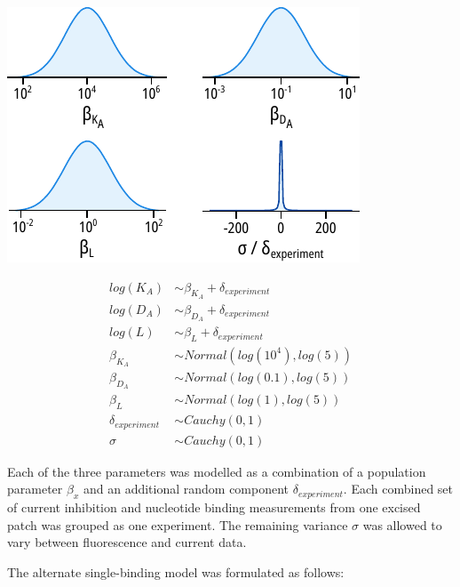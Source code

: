 \begin{minipage}{.5\textwidth}
\centering
\includegraphics[width=\textwidth]{mwc_priors.pdf}
\end{minipage}
\begin{minipage}{.5\textwidth}
\centering
\begin{equation} \label{eq:mwc_priors}
\begin{split}
log(K_A) &\sim \beta_{K_A} + \delta_{experiment} \\
log(D_A) &\sim \beta_{D_A} + \delta_{experiment} \\
log(L) &\sim \beta_{L} + \delta_{experiment} \\
\beta_{K_A} &\sim Normal(log(10^4), log(5)) \\
\beta_{D_A} &\sim Normal(log(0.1), log(5)) \\
\beta_{L} &\sim Normal(log(1), log(5)) \\
\delta_{experiment} &\sim Cauchy(0, 1) \\
\sigma &\sim Cauchy(0, 1)
\end{split}
\end{equation}
\end{minipage}

Each of the three parameters was modelled as a combination of a population parameter $\beta_x$ and an additional random component $\delta_{experiment}$.
Each combined set of current inhibition and nucleotide binding measurements from one excised patch was grouped as one experiment.
The remaining variance $\sigma$ was allowed to vary between fluorescence and current data.

The alternate single-binding model was formulated as follows:

